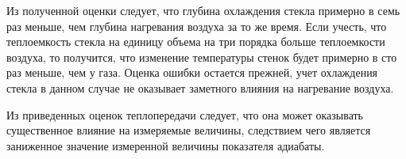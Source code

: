 \documentclass[a4paper,12pt]{article}
\theoremstyle{plain} %
\theoremstyle{definition} %
\theoremstyle{remark} %
\begin{document}
Из полученной оценки следует, что глубина охлаждения стекла примерно в семь раз меньше, чем глубина нагревания воздуха за то же время. Если учесть, что теплоемкость стекла на единицу объема на три порядка больше теплоемкости воздуха, то получится, что изменение температуры стенок будет примерно в сто раз меньше, чем у газа. Оценка ошибки остается прежней, учет охлаждения стекла в данном случае не оказывает заметного влияния на нагревание воздуха.

Из приведенных оценок теплопередачи следует, что она может оказывать существенное влияние на измеряемые величины, следствием чего является заниженное значение измеренной величины показателя адиабаты. 
\end{document}
